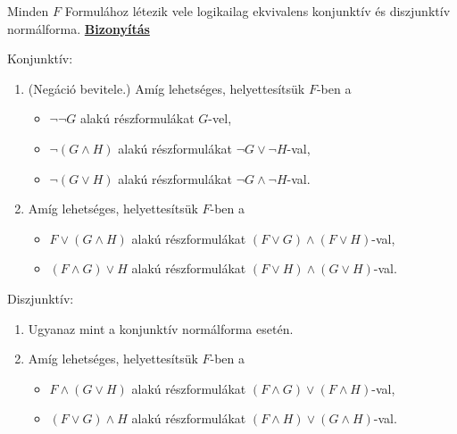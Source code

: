 \documentclass[10pt]{article}
\renewcommand{\\}{\par\noindent}
\begin{document}
\begin{frame}

\begin{tcolorbox}[squeezed title={Tétel: Konjunktív és diszjunktív normálforma létezése}]
Minden $F$ Formulához létezik vele logikailag ekvivalens konjunktív és diszjunktív normálforma.
\tcblower
\smallskip
\underline{\textbf{Bizonyítás}}\\
\medskip
\\
Konjunktív:
\begin{enumerate}
\color{black}
	\item (Negáció bevitele.) Amíg lehetséges, helyettesítsük $F$-ben a
	\begin{itemize}
		\item $\neg \neg G$ alakú részformulákat $G$-vel,
		\item $\neg (G \land H)$ alakú részformulákat $\neg G \lor \neg H$-val,
		\item $\neg (G \lor H)$ alakú részformulákat $\neg G \land \neg H$-val.
	\end{itemize}
	\item Amíg lehetséges, helyettesítsük $F$-ben a
	\begin{itemize}
		\item $F \lor (G \land H)$ alakú részformulákat $(F \lor G) \land (F \lor H)$-val,
		\item $(F \land G) \lor H$ alakú részformulákat $(F \lor H) \land (G \lor H)$-val.
	\end{itemize}
\end{enumerate}
\bigskip
Diszjunktív:
\begin{enumerate}
	\item Ugyanaz mint a konjunktív normálforma esetén.
	\item Amíg lehetséges, helyettesítsük $F$-ben a
	\begin{itemize}
		\item $F \land (G \lor H)$ alakú részformulákat $(F \land G) \lor (F \land H)$-val,
		\item $(F \lor G) \land H$ alakú részformulákat $(F \land H) \lor (G \land H)$-val.
	\end{itemize}
\end{enumerate}
\end{tcolorbox}

\end{frame}
\end{document}
